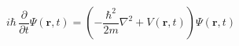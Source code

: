 \documentclass[aspectratio=169]{beamer}
\begin{document}
\begin{wallpaperframe}
\[
i\hbar\,\frac{\partial}{\partial t}\Psi(\mathbf{r},t)
= \left(-\frac{\hbar^2}{2m}\nabla^2 + V(\mathbf{r},t)\right)\Psi(\mathbf{r},t)
\]
\end{wallpaperframe}
\end{document}
